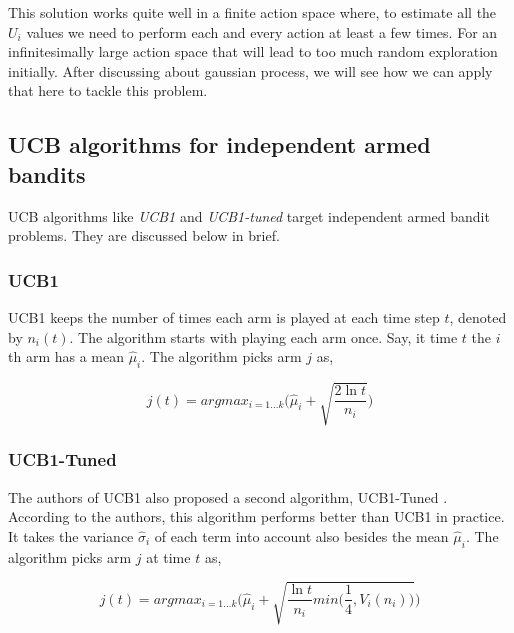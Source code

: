 \documentclass[english]{tktltiki}
\begin{document}
This solution works quite well in a finite action space where, to estimate all the $U_i$ values we need to perform each and every action at least a few times. For an infinitesimally large action space that will lead to too much random exploration initially. After discussing about gaussian process, we will see how we can apply that here to tackle this problem.

\subsection{UCB algorithms for independent armed bandits}

UCB algorithms like \textit{UCB1} and \textit{UCB1-tuned} target independent armed bandit problems. They are discussed below in brief.

\subsubsection{UCB1}

UCB1 \cite{independent_arm_bandits_2} keeps the number of times each arm is played at each time step $t$, denoted by $n_i(t)$. The algorithm starts with playing each arm once. Say, it time $t$ the $i$th arm has a mean $\hat{\mu}_i$. The algorithm picks arm $j$ as,

\begin{equation}
	j(t) = arg max_{i = 1 ... k}\Bigg(\hat{\mu}_i + \sqrt{\frac{2 \ln t}{n_i}}\Bigg)
\end{equation}

\subsubsection{UCB1-Tuned}

The authors of UCB1 also proposed a second algorithm, UCB1-Tuned \cite{independent_arm_bandits_algorithms}. According to the authors, this algorithm performs better than UCB1 in practice. It takes the variance $\hat{\sigma}_i$ of each term into account also besides the mean $\hat{\mu}_i$. The algorithm picks arm $j$ at time $t$ as,

\begin{equation}
	j(t) = arg max_{i = 1 ... k}\Bigg(\hat{\mu}_i + \sqrt{\frac{\ln t}{n_i}min\Big(\frac{1}{4}, V_i(n_i)\Big)}\Bigg)
\end{equation}
\end{document}
